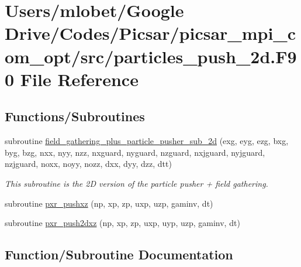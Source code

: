 \hypertarget{particles__push__2d_8_f90}{}\section{Users/mlobet/\+Google Drive/\+Codes/\+Picsar/picsar\+\_\+mpi\+\_\+com\+\_\+opt/src/particles\+\_\+push\+\_\+2d.F90 File Reference}
\label{particles__push__2d_8_f90}
\subsection*{Functions/\+Subroutines}
\begin{DoxyCompactItemize}
\item 
subroutine \hyperlink{particles__push__2d_8_f90_a1498d53375cbc1abc8366bb22720df98}{field\+\_\+gathering\+\_\+plus\+\_\+particle\+\_\+pusher\+\_\+sub\+\_\+2d} (exg, eyg, ezg, bxg, byg, bzg, nxx, nyy, nzz, nxguard, nyguard, nzguard, nxjguard, nyjguard, nzjguard, noxx, noyy, nozz, dxx, dyy, dzz, dtt)
\begin{DoxyCompactList}\small\item\em This subroutine is the 2D version of the particle pusher + field gathering. \end{DoxyCompactList}\item 
subroutine \hyperlink{particles__push__2d_8_f90_a91aeb80861b58a94e7ffc6161dfe8ace}{pxr\+\_\+pushxz} (np, xp, zp, uxp, uzp, gaminv, dt)
\item 
subroutine \hyperlink{particles__push__2d_8_f90_ae7614cd9c00b7544eae3c20b1e99505d}{pxr\+\_\+push2dxz} (np, xp, zp, uxp, uyp, uzp, gaminv, dt)
\end{DoxyCompactItemize}


\subsection{Function/\+Subroutine Documentation}
